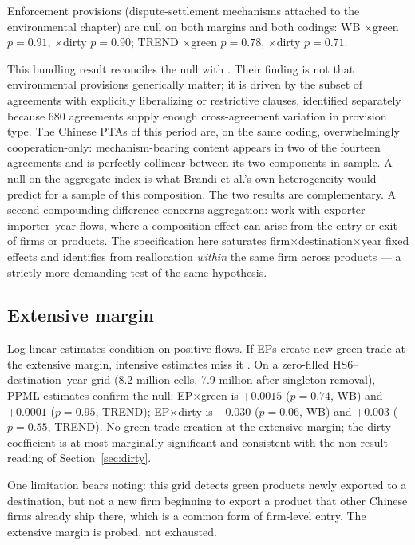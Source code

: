 \documentclass[12pt]{article}
\begin{document}
Enforcement provisions (dispute-settlement mechanisms attached to the environmental
chapter) are null on both margins and both codings: WB $\times$green $p = 0.91$, $\times$dirty
$p = 0.90$; TREND $\times$green $p = 0.78$, $\times$dirty $p = 0.71$.

This bundling result reconciles the null with \citet{brandi2020}. Their finding is not
that environmental provisions generically matter; it is driven by the subset of agreements
with explicitly liberalizing or restrictive clauses, identified separately because 680
agreements supply enough cross-agreement variation in provision type. The Chinese PTAs of
this period are, on the same coding, overwhelmingly cooperation-only: mechanism-bearing
content appears in two of the fourteen agreements and is perfectly collinear between its
two components in-sample. A null on the aggregate index is what Brandi et al.'s own
heterogeneity would predict for a sample of this composition. The two results are
complementary. A second compounding difference concerns aggregation: \citet{brandi2020}
work with exporter--importer--year flows, where a composition effect can arise from the
entry or exit of firms or products. The specification here saturates
firm$\times$destination$\times$year fixed effects and identifies from reallocation
\emph{within} the same firm across products --- a strictly more demanding test of the
same hypothesis.

\subsection{Extensive margin}

Log-linear estimates condition on positive flows. If EPs create new green trade at the
extensive margin, intensive estimates miss it \citep{santossilva2006}. On a zero-filled
HS6--destination--year grid (8.2 million cells, 7.9 million after singleton removal), PPML estimates confirm the null:
EP$\times$green is $+0.0015$ ($p = 0.74$, WB) and $+0.0001$ ($p = 0.95$, TREND);
EP$\times$dirty is $-0.030$ ($p = 0.06$, WB) and $+0.003$ ($p = 0.55$, TREND). No
green trade creation at the extensive margin; the dirty coefficient is at most marginally
significant and consistent with the non-result reading of Section~\ref{sec:dirty}.

One limitation bears noting: this grid detects green products newly exported to a
destination, but not a new firm beginning to export a product that other Chinese firms
already ship there, which is a common form of firm-level entry. The extensive margin is
probed, not exhausted.
\end{document}
